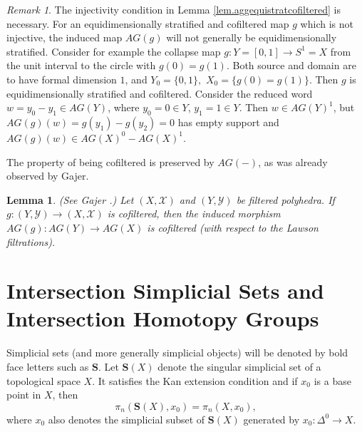 \documentclass{amsart}
\newtheorem{lemma}[thm]{Lemma}
\theoremstyle{definition}
\theoremstyle{remark}
\newtheorem{remark}[thm]{Remark}
\newcommand {\Xa}    {\ensuremath{\mathcal{X}}}
\newcommand {\Ya}    {\ensuremath{\mathcal{Y}}}
\newcommand {\sS}    {\mathbf{S}}
\begin{document}
\begin{remark}
The injectivity condition in Lemma \ref{lem.aggequistratcofiltered}
is necessary. For an equidimensionally stratified and cofiltered map $g$ which is
not injective, the induced map $AG(g)$ will not generally be
equidimensionally stratified.
Consider for example the collapse map $g: Y=[0,1] \to S^1=X$ from the unit
interval to the circle with $g(0)=g(1)$. Both source and domain are
to have formal dimension $1$, and $Y_0 = \{ 0,1 \},$ $X_0 = \{ g(0)=g(1) \}$.
Then $g$ is equidimensionally stratified and cofiltered.
Consider the reduced word $w= y_0 - y_1 \in AG(Y)$, where
$y_0 =0\in Y$, $y_1 =1 \in Y$. 
Then $w \in AG(Y)^1$, but
$AG (g)(w) = g(y_1) - g(y_2) =0$ has empty support and
$AG(g)(w) \in AG (X)^0 - AG(X)^1$.
\end{remark}

The property of being cofiltered is preserved by $AG(-)$, as was
already observed by Gajer.
\begin{lemma} \label{lem.cofilteredpresbyag}
(See Gajer \cite[p. 961]{gajer}.)
Let $(X,\Xa)$ and $(Y,\Ya)$ be filtered polyhedra.
If $g: (Y,\Ya) \to (X,\Xa)$ is
cofiltered, then the induced morphism $AG(g): AG(Y) \to AG(X)$
is cofiltered (with respect to the Lawson filtrations).
\end{lemma}




\section{Intersection Simplicial Sets and Intersection Homotopy Groups}

Simplicial sets (and more generally simplicial objects) 
will be denoted by bold face letters such as $\sS$.
Let $\sS (X)$ denote the singular simplicial set of a topological 
space $X$. It satisfies the Kan extension condition and
if $x_0$ is a base point in $X$, then
\begin{equation}  \label{equ.htpygrpsofsingsimplset}
\pi_n (\sS (X), x_0) = \pi_n (X, x_0), 
\end{equation}
where $x_0$ also denotes the simplicial subset of $\sS (X)$
generated by $x_0: \Delta^0 \to X$.
\end{document}

